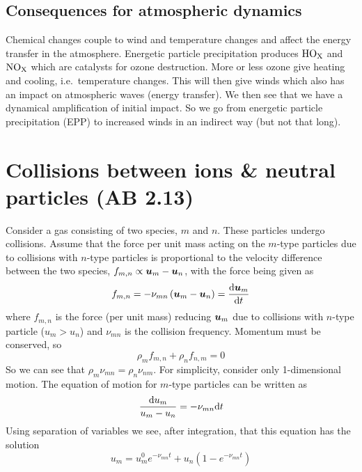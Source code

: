 \subsection{Consequences for atmospheric dynamics}
Chemical changes couple to wind and temperature changes and affect the energy transfer in the atmosphere. Energetic particle precipitation produces \(\textnormal{HO}_{\textnormal{X}}\) and \(\textnormal{NO}_{\textnormal{X}}\) which are catalysts for ozone destruction. More or less ozone give heating and cooling, i.e.\ temperature changes. This will then give winds which also has an impact on atmospheric waves (energy transfer). We then see that we have a dynamical amplification of initial impact. So we go from energetic particle precipitation (EPP) to increased winds in an indirect way (but not that long).

\section[Collisions between ions \& neutral particles]{Collisions between ions \& neutral particles (AB 2.13)}
Consider a gas consisting of two species, \(m\) and \(n\). These particles undergo collisions. Assume that the force per unit mass acting on the \(m\)-type particles due to collisions with \(n\)-type particles is proportional to the velocity difference between the two species, \(f_{m,n}\propto\boldsymbol{u}_m-\boldsymbol{u}_n\), with the force being given as
\begin{equation*}
    f_{m,n}=-\nu_{mn}\left(\boldsymbol{u}_m-\boldsymbol{u}_n\right)=\frac{\textnormal{d}\boldsymbol{u}_m}{\textnormal{d}t}
\end{equation*}
where \(f_{m,n}\) is the force (per unit mass) reducing \(\boldsymbol{u}_m\) due to collisions with \(n\)-type particle (\(u_m>u_n\)) and \(\nu_{mn}\) is the collision frequency. Momentum must be conserved, so
\begin{equation*}
    \rho_{m}f_{m,n}+\rho_{n}f_{n,m}=0
\end{equation*}
So we can see that \(\rho_m\nu_{mn}=\rho_n\nu_{nm}\). For simplicity, consider only 1-dimensional motion. The equation of motion for \(m\)-type particles can be written as
\begin{equation*}
    \frac{\textnormal{d}u_m}{u_m-u_n}=-\nu_{mn}\textnormal{d}t
\end{equation*}
Using separation of variables we see, after integration, that this equation has the solution
\begin{equation*}
    u_m=u_m^0e^{-\nu_{mn}t}+u_n\left(1-e^{-\nu_{mn}t}\right)
\end{equation*}
